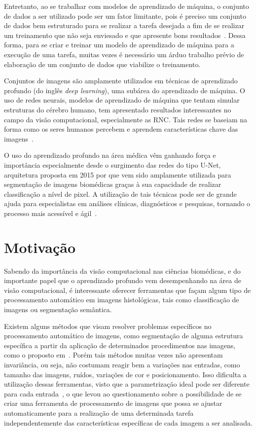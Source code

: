     Entretanto, ao se trabalhar com modelos de aprendizado de máquina, o conjunto de dados a ser utilizado pode ser um fator limitante, pois é preciso um conjunto de dados bem estruturado para se realizar a tarefa desejada a fim de se realizar um treinamento que não seja enviesado e que apresente bons resultados~\cite{paullada2021data}. Dessa forma, para se criar e treinar um modelo de aprendizado de máquina para a execução de uma tarefa, muitas vezes é necessário um árduo trabalho prévio de elaboração de um conjunto de dados que viabilize o treinamento.
    
    Conjuntos de imagens são amplamente utilizados em técnicas de aprendizado profundo (do inglês \textit{deep learning}), uma subárea do aprendizado de máquina. O uso de redes neurais, modelos de aprendizado de máquina que tentam simular estruturas do cérebro humano, tem apresentado resultados interessantes no campo da visão computacional, especialmente as \acf{RNC}. Tais redes se baseiam na forma como os seres humanos percebem e aprendem características chave das imagens~\cite{rawat2017deep}.
    
    O uso do aprendizado profundo na área médica vêm ganhando força e importância especialmente desde o surgimento das redes do tipo U-Net, arquitetura proposta em 2015 por \cite{ronneberger2015u} que vem sido amplamente utilizada para segmentação de imagens biomédicas graças à sua capacidade de realizar classificação a nível de pixel. A utilização de tais técnicas pode ser de grande ajuda para especialistas em análises clínicas, diagnósticos e pesquisas, tornando o processo mais acessível e ágil~\cite{esteva2021deep}.

\section{Motivação}

Sabendo da importância da visão computacional nas ciências biomédicas, e do importante papel que o aprendizado profundo vem desempenhando na área de visão computacional, é interessante oferecer ferramentas que façam algum tipo de processamento automático em imagens histológicas, tais como classificação de imagens ou segmentação semântica. 
    
    Existem alguns métodos que visam resolver problemas específicos no processamento automático de imagens, como segmentação de alguma estrutura específica a partir da aplicação de determinados procedimentos nas imagens, como o proposto em~\cite{gondim2021automatic}. Porém tais métodos muitas vezes não apresentam invariância, ou seja, não costumam reagir bem a variações nas entradas, como tamanho das imagens, ruídos, variações de cor e posicionamento. Isso dificulta a utilização dessas ferramentas, visto que a parametrização ideal pode ser diferente para cada entrada~\cite{linhares2022automated}, o que levou ao questionamento sobre a possibilidade de se criar uma ferramenta de processamento de imagens que possa se ajustar automaticamente para a realização de uma determinada tarefa independentemente das características específicas de cada imagem a ser analisada.
    
